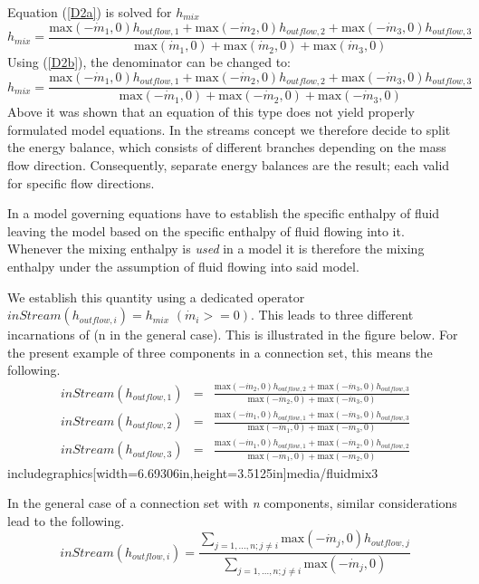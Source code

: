\documentclass[10pt,a4paper]{report}
\begin{document}
Equation (\ref{D2a}) is solved for $h_{mix}$
\begin{equation*}
h_{mix}=\frac{\text{max}(-\dot{m}_1,0)h_{outflow,1}+\text{max}(-\dot{m}_2,0)h_{outflow,2}+\text{max}(-\dot{m}_3,0)h_{outflow,3}}
{\text{max}(\dot{m}_1,0)+\text{max}(\dot{m}_2,0)+\text{max}(\dot{m}_3,0)}
\end{equation*}
Using (\ref{D2b}), the denominator can be changed to:
\begin{equation*}
h_{mix}=\frac{\text{max}(-\dot{m}_1,0)h_{outflow,1}+\text{max}(-\dot{m}_2,0)h_{outflow,2}+\text{max}(-\dot{m}_3,0)h_{outflow,3}}
{\text{max}(-\dot{m}_1,0)+\text{max}(-\dot{m}_2,0)+\text{max}(-\dot{m}_3,0)}
\end{equation*}
Above it was shown that an equation of this type does not yield properly
formulated model equations. In the streams concept we therefore decide
to split the energy balance, which consists of different branches
depending on the mass flow direction. Consequently, separate energy
balances are the result; each valid for specific flow directions.

In a model governing equations have to establish the specific enthalpy
of fluid leaving the model based on the specific enthalpy of fluid
flowing into it. Whenever the mixing enthalpy is \emph{used} in a model
it is therefore the mixing enthalpy under the assumption of fluid
flowing into said model.

We establish this quantity using a dedicated operator $inStream(h_{outflow,i})=h_{mix}$ $(\dot{m}_{i} >= 0)$. This leads to
three different incarnations of (n in the general case). This is
illustrated in the figure below. For the present example of three
components in a connection set, this means the following.
\begin{eqnarray*}
inStream(h_{outflow,1})&=&\frac{\text{max}(-\dot{m}_2,0)h_{outflow,2}+\text{max}(-\dot{m}_3,0)h_{outflow,3}}{\text{max}(-\dot{m}_2,0)+\text{max}(-\dot{m}_3,0)}\\
inStream(h_{outflow,2})&=&\frac{\text{max}(-\dot{m}_1,0)h_{outflow,1}+\text{max}(-\dot{m}_3,0)h_{outflow,3}}{\text{max}(-\dot{m}_1,0)+\text{max}(-\dot{m}_3,0)}\\
inStream(h_{outflow,3})&=&\frac{\text{max}(-\dot{m}_1,0)h_{outflow,1}+\text{max}(-\dot{m}_2,0)h_{outflow,2}}{\text{max}(-\dot{m}_1,0)+\text{max}(-\dot{m}_2,0)}
\end{eqnarray*}
includegraphics[width=6.69306in,height=3.5125in]{media/fluidmix3}

In the general case of a connection set with \emph{n} components,
similar considerations lead to the following.
\begin{equation*}
inStream(h_{outflow,i})=\frac{\sum_{j=1,...,n;j\neq i}\text{max}(-\dot{m}_j,0)h_{outflow,j}}{\sum_{j=1,...,n;j\neq i}\text{max}(-\dot{m}_j,0)}
\end{equation*}
\end{document}
